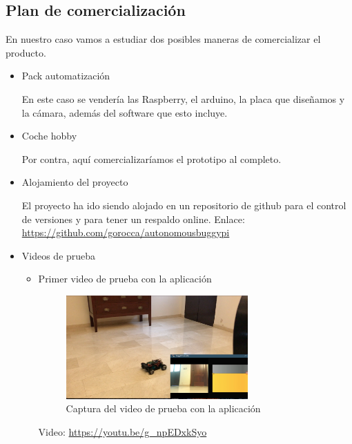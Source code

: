 \documentclass{pclass}
\begin{document}
\subsection{Plan de comercialización}

	En nuestro caso vamos a estudiar dos posibles maneras de comercializar el producto.

	\begin{itemize}
		\item Pack automatización
		
			En este caso se vendería las Raspberry, el arduino, la placa que diseñamos y la cámara, además del software que esto incluye. 
			
		\item Coche hobby
		
			Por contra, aquí comercializaríamos el prototipo al completo.
		
	\end{itemize}
 
	
	
	 
	



\begin{itemize}
	\item Alojamiento del proyecto
	
		El proyecto ha ido siendo alojado en un repositorio de github para el control de versiones y para tener un respaldo online. Enlace: \url{https://github.com/gorocca/autonomousbuggypi}
	
	\item Videos de prueba
		\begin{itemize}
			\item Primer video de prueba con la aplicación
				\begin{figure}[H]
					\centering
					\includegraphics[width=0.7\textwidth]{img/capturaPrimerVideoApp}
					\caption{Captura del video de prueba con la aplicación}
					\label{fig:capturaPrimerVideoApp}
				\end{figure}
		
				 Video: \url{https://youtu.be/g_npEDxkSyo}
				
		\end{itemize}
		
\end{itemize}
\end{document}
